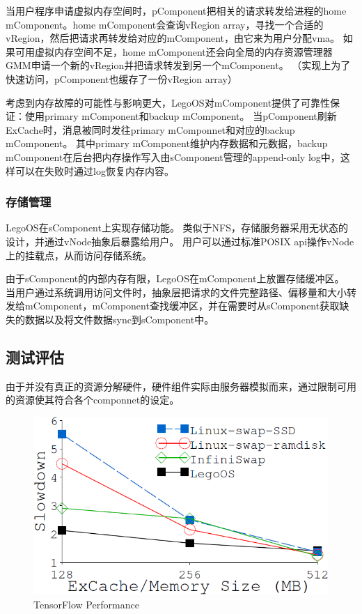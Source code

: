 当用户程序申请虚拟内存空间时，pComponent把相关的请求转发给进程的home mComponent。home mComponent会查询vRegion array，寻找一个合适的vRegion，然后把请求再转发给对应的mComponent，由它来为用户分配vma。
如果可用虚拟内存空间不足，home mComponent还会向全局的内存资源管理器GMM申请一个新的vRegion并把请求转发到另一个mComponent。
（实现上为了快速访问，pComponent也缓存了一份vRegion array）

考虑到内存故障的可能性与影响更大，LegoOS对mComponent提供了可靠性保证：使用primary mComponent和backup mComponent。
当pComponent刷新ExCache时，消息被同时发往primary mComponnet和对应的backup mComponent。
其中primary mComponent维护内存数据和元数据，backup mComponent在后台把内存操作写入由sComponent管理的append-only log中，这样可以在失败时通过log恢复内存内容。

\subsubsection{存储管理}

LegoOS在sComponent上实现存储功能。
类似于NFS，存储服务器采用无状态的设计，并通过vNode抽象后暴露给用户。
用户可以通过标准POSIX api操作vNode上的挂载点，从而访问存储系统。

由于sComponent的内部内存有限，LegoOS在mComponent上放置存储缓冲区。
当用户通过系统调用访问文件时，抽象层把请求的文件完整路径、偏移量和大小转发给mComponent，mComponent查找缓冲区，并在需要时从sComponent获取缺失的数据以及将文件数据sync到sComponent中。

\subsection{测试评估}

由于并没有真正的资源分解硬件，硬件组件实际由服务器模拟而来，通过限制可用的资源使其符合各个componnet的设定。

\begin{figure}[h]
\centering
\includegraphics[scale=0.50]{Figures/system/tensorflow_perf.png}
\decoRule
\caption{TensorFlow Performance}
\label{fig:tensorflow_perf}
\end{figure}

